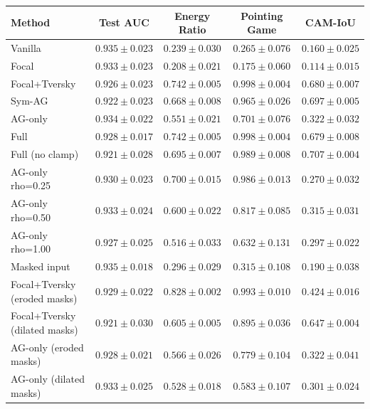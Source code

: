 
\begin{tabular}{l c c c c}
\toprule
\textbf{Method} & \textbf{Test AUC} & \textbf{Energy Ratio} & \textbf{Pointing Game} & \textbf{CAM-IoU} \\
\midrule
Vanilla & $0.935 \pm 0.023$ & $0.239 \pm 0.030$ & $0.265 \pm 0.076$ & $0.160 \pm 0.025$ \\
Focal & $0.933 \pm 0.023$ & $0.208 \pm 0.021$ & $0.175 \pm 0.060$ & $0.114 \pm 0.015$ \\
Focal+Tversky & $0.926 \pm 0.023$ & $0.742 \pm 0.005$ & $0.998 \pm 0.004$ & $0.680 \pm 0.007$ \\
Sym-AG & $0.922 \pm 0.023$ & $0.668 \pm 0.008$ & $0.965 \pm 0.026$ & $0.697 \pm 0.005$ \\
AG-only & $0.934 \pm 0.022$ & $0.551 \pm 0.021$ & $0.701 \pm 0.076$ & $0.322 \pm 0.032$ \\
Full & $0.928 \pm 0.017$ & $0.742 \pm 0.005$ & $0.998 \pm 0.004$ & $0.679 \pm 0.008$ \\
Full (no clamp) & $0.921 \pm 0.028$ & $0.695 \pm 0.007$ & $0.989 \pm 0.008$ & $0.707 \pm 0.004$ \\
AG-only rho=0.25 & $0.930 \pm 0.023$ & $0.700 \pm 0.015$ & $0.986 \pm 0.013$ & $0.270 \pm 0.032$ \\
AG-only rho=0.50 & $0.933 \pm 0.024$ & $0.600 \pm 0.022$ & $0.817 \pm 0.085$ & $0.315 \pm 0.031$ \\
AG-only rho=1.00 & $0.927 \pm 0.025$ & $0.516 \pm 0.033$ & $0.632 \pm 0.131$ & $0.297 \pm 0.022$ \\
Masked input & $0.935 \pm 0.018$ & $0.296 \pm 0.029$ & $0.315 \pm 0.108$ & $0.190 \pm 0.038$ \\
Focal+Tversky (eroded masks) & $0.929 \pm 0.022$ & $0.828 \pm 0.002$ & $0.993 \pm 0.010$ & $0.424 \pm 0.016$ \\
Focal+Tversky (dilated masks) & $0.921 \pm 0.030$ & $0.605 \pm 0.005$ & $0.895 \pm 0.036$ & $0.647 \pm 0.004$ \\
AG-only (eroded masks) & $0.928 \pm 0.021$ & $0.566 \pm 0.026$ & $0.779 \pm 0.104$ & $0.322 \pm 0.041$ \\
AG-only (dilated masks) & $0.933 \pm 0.025$ & $0.528 \pm 0.018$ & $0.583 \pm 0.107$ & $0.301 \pm 0.024$ \\
\bottomrule
\end{tabular}

